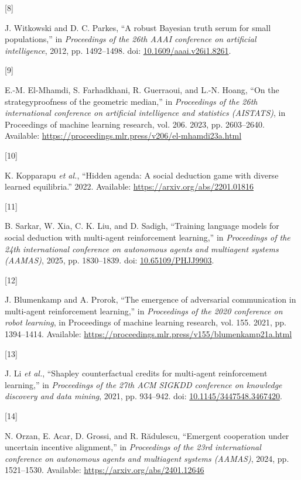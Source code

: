 \documentclass[
  12pt,
]{article}
\newlength{\cslhangindent}
\newlength{\csllabelwidth}
\newenvironment{CSLReferences}[2] %
 {\begin{list}{}{%
  \setlength{\itemindent}{0pt}
  \setlength{\leftmargin}{0pt}
  \setlength{\parsep}{0pt}
  \ifodd #1
   \setlength{\leftmargin}{\cslhangindent}
   \setlength{\itemindent}{-1\cslhangindent}
  \fi
  \setlength{\itemsep}{#2\baselineskip}}}
 {\end{list}}
\newcommand{\CSLLeftMargin}[1]{\parbox[t]{\csllabelwidth}{\strut#1\strut}}
\newcommand{\CSLRightInline}[1]{\parbox[t]{\linewidth - \csllabelwidth}{\strut#1\strut}}
\begin{document}
\begin{CSLReferences}{0}{0}
\CSLLeftMargin{{[}8{]} }%
\CSLRightInline{J. Witkowski and D. C. Parkes, {``A robust {B}ayesian
truth serum for small populations,''} in \emph{Proceedings of the 26th
AAAI conference on artificial intelligence}, 2012, pp. 1492--1498. doi:
\href{https://doi.org/10.1609/aaai.v26i1.8261}{10.1609/aaai.v26i1.8261}.}

\CSLLeftMargin{{[}9{]} }%
\CSLRightInline{E.-M. El-Mhamdi, S. Farhadkhani, R. Guerraoui, and L.-N.
Hoang, {``On the strategyproofness of the geometric median,''} in
\emph{Proceedings of the 26th international conference on artificial
intelligence and statistics (AISTATS)}, in Proceedings of machine
learning research, vol. 206. 2023, pp. 2603--2640. Available:
\url{https://proceedings.mlr.press/v206/el-mhamdi23a.html}}

\CSLLeftMargin{{[}10{]} }%
\CSLRightInline{K. Kopparapu \emph{et al.}, {``Hidden agenda: A social
deduction game with diverse learned equilibria.''} 2022. Available:
\url{https://arxiv.org/abs/2201.01816}}

\CSLLeftMargin{{[}11{]} }%
\CSLRightInline{B. Sarkar, W. Xia, C. K. Liu, and D. Sadigh, {``Training
language models for social deduction with multi-agent reinforcement
learning,''} in \emph{Proceedings of the 24th international conference
on autonomous agents and multiagent systems (AAMAS)}, 2025, pp.
1830--1839. doi:
\href{https://doi.org/10.65109/PHJJ9903}{10.65109/PHJJ9903}.}

\CSLLeftMargin{{[}12{]} }%
\CSLRightInline{J. Blumenkamp and A. Prorok, {``The emergence of
adversarial communication in multi-agent reinforcement learning,''} in
\emph{Proceedings of the 2020 conference on robot learning}, in
Proceedings of machine learning research, vol. 155. 2021, pp.
1394--1414. Available:
\url{https://proceedings.mlr.press/v155/blumenkamp21a.html}}

\CSLLeftMargin{{[}13{]} }%
\CSLRightInline{J. Li \emph{et al.}, {``Shapley counterfactual credits
for multi-agent reinforcement learning,''} in \emph{Proceedings of the
27th ACM SIGKDD conference on knowledge discovery and data mining},
2021, pp. 934--942. doi:
\href{https://doi.org/10.1145/3447548.3467420}{10.1145/3447548.3467420}.}

\CSLLeftMargin{{[}14{]} }%
\CSLRightInline{N. Orzan, E. Acar, D. Grossi, and R. Rădulescu,
{``Emergent cooperation under uncertain incentive alignment,''} in
\emph{Proceedings of the 23rd international conference on autonomous
agents and multiagent systems (AAMAS)}, 2024, pp. 1521--1530. Available:
\url{https://arxiv.org/abs/2401.12646}}


\end{CSLReferences}
\end{document}
